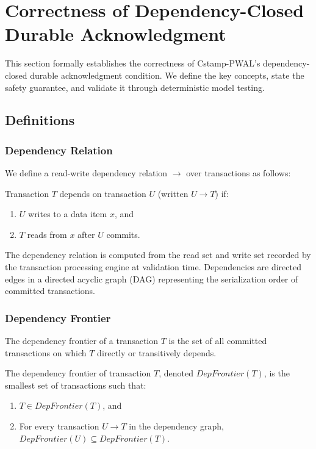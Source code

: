 \section{Correctness of Dependency-Closed Durable Acknowledgment}
\label{sec:correctness}

This section formally establishes the correctness of Cstamp-PWAL's
dependency-closed durable acknowledgment condition.  We define the key concepts,
state the safety guarantee, and validate it through deterministic model testing.

\subsection{Definitions}
\label{sec:correctness-definitions}

\subsubsection{Dependency Relation}

We define a read-write dependency relation $\to$ over transactions as follows:

\begin{definition}
Transaction $T$ depends on transaction $U$ (written $U \to T$) if:
\begin{enumerate}
  \item $U$ writes to a data item $x$, and
  \item $T$ reads from $x$ after $U$ commits.
\end{enumerate}
\end{definition}

The dependency relation is computed from the read set and write set recorded by
the transaction processing engine at validation time.  Dependencies are directed
edges in a directed acyclic graph (DAG) representing the serialization order of
committed transactions.

\subsubsection{Dependency Frontier}

The dependency frontier of a transaction $T$ is the set of all committed
transactions on which $T$ directly or transitively depends.

\begin{definition}
The dependency frontier of transaction $T$, denoted $\mathit{DepFrontier}(T)$, is
the smallest set of transactions such that:
\begin{enumerate}
  \item $T \in \mathit{DepFrontier}(T)$, and
  \item For every transaction $U \to T$ in the dependency graph,
        $\mathit{DepFrontier}(U) \subseteq \mathit{DepFrontier}(T)$.
\end{enumerate}
\end{definition}

